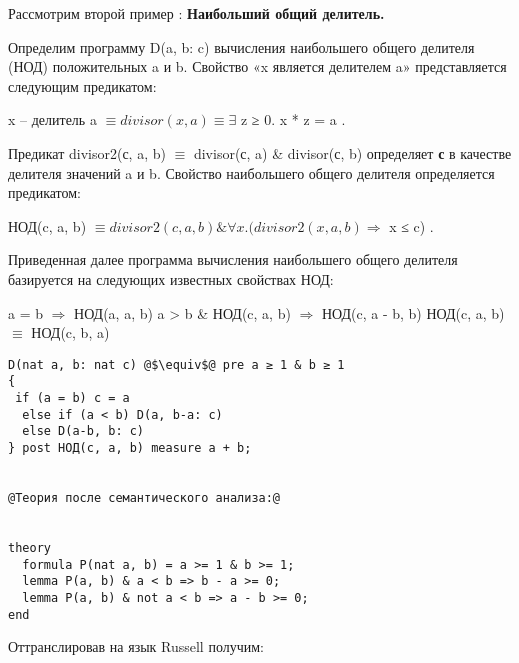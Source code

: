 \documentclass[10pt,a4paper]{article}
\begin{document}
\begin{flushleft}


Рассмотрим второй пример : \textbf{Наибольший общий делитель.}

Определим программу D(a, b: c) вычисления наибольшего общего делителя (НОД) положительных a и b. Свойство «x является делителем a» представляется следующим предикатом:
\end{flushleft}
\begin{center}
x – делитель a $\equiv divisor(x, a) \equiv \exists$ z ≥ 0. x * z = a .
\end{center}
\begin{flushleft}
Предикат divisor2(с, a, b) $\equiv$ divisor(с, a) \& divisor(с, b) определяет \textbf{с} в качестве делителя значений a и b. Свойство наибольшего общего делителя определяется предикатом:
\end{flushleft}
\begin{center}
НОД(c, a, b) $\equiv divisor2(c , a, b)  \&  \forall  x. (divisor2(x, a, b) \Rightarrow$ x ≤ c) .
\end{center}
Приведенная далее программа вычисления наибольшего общего делителя базируется на следующих известных свойствах НОД:
\begin{center}
a = b  $\Rightarrow$ НОД(a, a, b)
a > b \& НОД(c, a, b) $\Rightarrow$  НОД(c, a - b, b)
НОД(c, a, b) $\equiv$ НОД(c, b, a)
\end{center}
\begin{flushleft}
\begin{lstlisting}
D(nat a, b: nat c) @$\equiv$@ pre a ≥ 1 & b ≥ 1
{
 if (a = b) c = a
  else if (a < b) D(a, b-a: c)
  else D(a-b, b: c)
} post НОД(c, a, b) measure a + b;


@Теория после семантического анализа:@


theory
  formula P(nat a, b) = a >= 1 & b >= 1;
  lemma P(a, b) & a < b => b - a >= 0;
  lemma P(a, b) & not a < b => a - b >= 0;
end
\end{lstlisting}
\end{flushleft}
\begin{flushleft}
Оттранслировав на язык Russell получим:
\end{flushleft}
\end{document}
